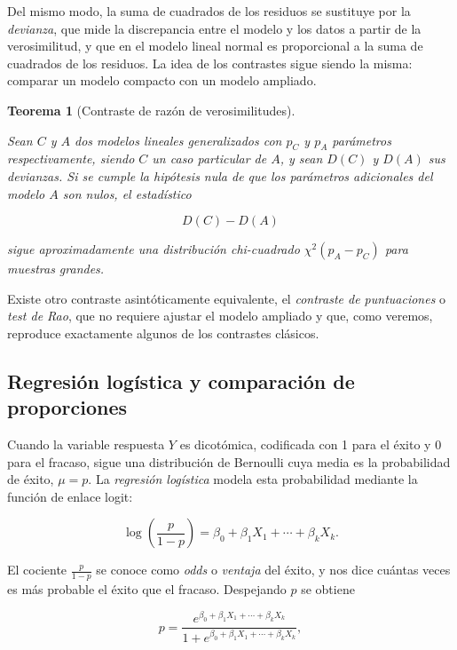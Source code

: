 \documentclass[
  spanish,
  a4paper,
]{scrreport}
\theoremstyle{plain}
\newtheorem{theorem}{Teorema}[chapter]
\theoremstyle{definition}
\theoremstyle{definition}
\theoremstyle{remark}
\begin{document}
Del mismo modo, la suma de cuadrados de los residuos se sustituye por la
\emph{devianza}, que mide la discrepancia entre el modelo y los datos a
partir de la verosimilitud, y que en el modelo lineal normal es
proporcional a la suma de cuadrados de los residuos. La idea de los
contrastes sigue siendo la misma: comparar un modelo compacto con un
modelo ampliado.

\begin{theorem}[Contraste de razón de
verosimilitudes]\protect\hypertarget{thm-contraste-razon-verosimilitudes}{}\label{thm-contraste-razon-verosimilitudes}

Sean \(C\) y \(A\) dos modelos lineales generalizados con \(p_C\) y
\(p_A\) parámetros respectivamente, siendo \(C\) un caso particular de
\(A\), y sean \(D(C)\) y \(D(A)\) sus devianzas. Si se cumple la
hipótesis nula de que los parámetros adicionales del modelo \(A\) son
nulos, el estadístico

\[
D(C)-D(A)
\]

sigue aproximadamente una distribución chi-cuadrado \(\chi^2(p_A-p_C)\)
para muestras grandes.

\end{theorem}

Existe otro contraste asintóticamente equivalente, el \emph{contraste de
puntuaciones} o \emph{test de Rao}, que no requiere ajustar el modelo
ampliado y que, como veremos, reproduce exactamente algunos de los
contrastes clásicos.

\subsection{Regresión logística y comparación de
proporciones}\label{regresiuxf3n-loguxedstica-y-comparaciuxf3n-de-proporciones}

Cuando la variable respuesta \(Y\) es dicotómica, codificada con 1 para
el éxito y 0 para el fracaso, sigue una distribución de Bernoulli cuya
media es la probabilidad de éxito, \(\mu=p\). La \emph{regresión
logística} modela esta probabilidad mediante la función de enlace logit:

\[
\log\left(\frac{p}{1-p}\right) = \beta_0 + \beta_1X_1 + \cdots + \beta_kX_k.
\]

El cociente \(\frac{p}{1-p}\) se conoce como \emph{odds} o
\emph{ventaja} del éxito, y nos dice cuántas veces es más probable el
éxito que el fracaso. Despejando \(p\) se obtiene

\[
p = \frac{e^{\beta_0 + \beta_1X_1 + \cdots + \beta_kX_k}}{1+e^{\beta_0 + \beta_1X_1 + \cdots + \beta_kX_k}},
\]
\end{document}
